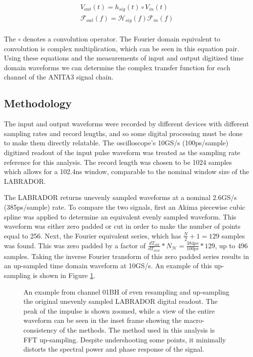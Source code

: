\begin{equation}
\begin{split}
V_{out}(t) = h_{sig}(t) \circ V_{in}(t) \\
\mathcal{F}_{out}(f) = \mathcal{H}_{sig}(f) \mathcal{F}_{in}(f) \\
\label{eqn:ComplexTF}
\end{split}
\end{equation}

The $\circ$ denotes a convolution operator.  The Fourier domain equivalent to convolution is complex multiplication, which can be seen in this equation pair.  Using these equations and the measurements of input and output digitized time domain waveforms we can determine the complex transfer function for each channel of the ANITA3 signal chain.


	\subsection{Methodology}
		The input and output waveforms were recorded by different devices with different sampling rates and record lengths, and so some digital processing must be done to make them directly relatable.  The oscilloscope's 10GS/s (100ps/sample) digitized readout of the input pulse waveform was treated as the sampling rate reference for this analysis.  The record length was chosen to be 1024 samples which allows for a 102.4ns window, comparable to the nominal window size of the LABRADOR.
		
		The LABRADOR returns unevenly sampled waveforms at a nominal 2.6GS/s (385ps/sample) rate.  To compare the two signals, first an Akima piecewise cubic spline was applied to determine an equivalent evenly sampled waveform.  This waveform was either zero padded or cut in order to make the number of points equal to 256.  Next, the Fourier equivalent series, which has $\frac{N}{2}+1 = 129$ samples was found. This was zero padded by a factor of $\frac{dT_{old}}{dT_{new}}*N_{\mathcal{H}} = \frac{384ps}{100ps}*129$, up to 496 samples.  Taking the inverse Fourier transform of this zero padded series results in an up-sampled time domain waveform at 10GS/s.  An example of this up-sampling is shown in Figure \ref{fig:sigChain_upsample}.
		
\begin{figure}
\centering
{}
	\caption{An example from channel 01BH of even resampling and up-sampling the original unevenly sampled LABRADOR digital readout.  The peak of the impulse is shown zoomed, while a view of the entire waveform can be seen in the inset frame showing the macro-consistency of the methods.  The method used in this analysis is  FFT up-sampling.  Despite undershooting some points, it minimally distorts the spectral power and phase response of the signal.}
\label{fig:sigChain_upsample}
\end{figure}			
		
